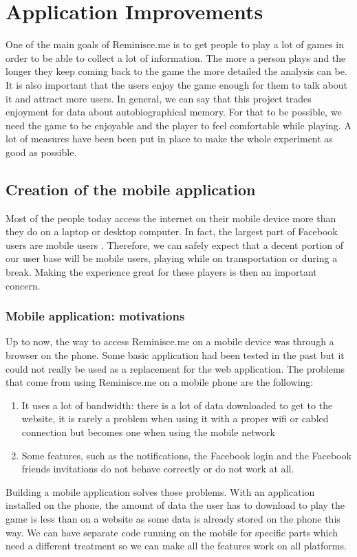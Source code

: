 \chapter{Application Improvements}
One of the main goals of Reminisce.me is to get people to play a lot of games in order to be able to collect a lot of information. The more a person plays and the longer they keep coming back to the game the more detailed the analysis can be. It is also important that the users enjoy the game enough for them to talk about it and attract more users. In general, we can say that this project trades enjoyment for data about autobiographical memory. For that to be possible, we need the game to be enjoyable and the player to feel comfortable while playing. A lot of measures have been been put in place to make the whole experiment as good as possible.
\section{Creation of the mobile application}
Most of the people today access the internet on their mobile device more than they do on a laptop or desktop computer. In fact, the largest part of Facebook users are mobile users \cite{mobileusage}. Therefore, we can safely expect that a decent portion of our user base will be mobile users, playing while on transportation or during a break. Making the experience great for these players is then an important concern.
\subsection{Mobile application: motivations}
Up to now, the way to access Reminisce.me on a mobile device was through a browser on the phone. Some basic application had been tested in the past but it could not really be used as a replacement for the web application. The problems that come from using Reminisce.me on a mobile phone are the following:
\begin{enumerate}
	\item It uses a lot of bandwidth: there is a lot of data downloaded to get to the website, it is rarely a problem when using it with a proper wifi or cabled connection but becomes one when using the mobile network
	\item Some features, such as the notifications, the Facebook login and the Facebook friends invitations do not behave correctly or do not work at all.
\end{enumerate}
Building a mobile application solves those problems. With an application installed on the phone, the amount of data the user has to download to play the game is less than on a website as some data is already stored on the phone this way. We can have separate code running on the mobile for specific parts which need a different treatment so we can make all the features work on all platforms.
